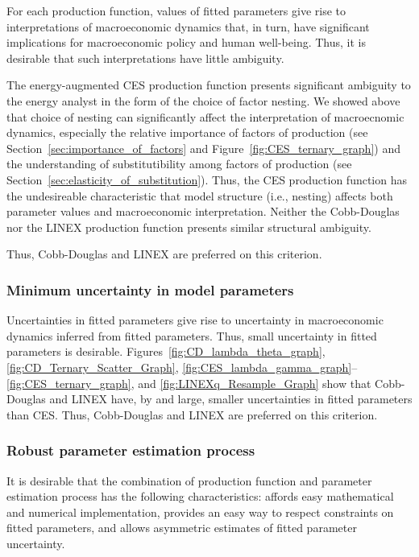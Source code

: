 \documentclass[preprint,authoryear,12pt]{elsarticle}\usepackage[]{graphicx}\usepackage[]{color}
\begin{document}
For each production function, 
values of fitted parameters give rise to interpretations of macroeconomic dynamics
that, in turn, have significant implications for macroeconomic policy
and human well-being.
Thus, it is desirable that such interpretations have little ambiguity.

The energy-augmented CES production function presents 
significant ambiguity to the energy analyst
in the form of the choice of factor nesting.
We showed above that choice of nesting 
can significantly affect 
the interpretation of macroecnomic dynamics, 
especially the relative importance of 
factors of production (see Section~\ref{sec:importance_of_factors}
and Figure~\ref{fig:CES_ternary_graph}) and 
the understanding of substitutibility 
among factors of production (see Section~\ref{sec:elasticity_of_substitution}).
Thus, the CES production function has the undesireable characteristic 
that model structure (i.e., nesting) affects both parameter values 
and macroeconomic interpretation.
Neither the Cobb-Douglas nor the LINEX production function 
presents similar structural ambiguity.

Thus, Cobb-Douglas and LINEX are preferred on this criterion.


\subsubsection{Minimum uncertainty in model parameters} 
\label{sec:min_uncertainty}

Uncertainties in fitted parameters give rise to uncertainty 
in macroeconomic dynamics inferred from fitted parameters.
Thus, small uncertainty in fitted parameters is desirable. 
Figures~\ref{fig:CD_lambda_theta_graph}, \ref{fig:CD_Ternary_Scatter_Graph},
\ref{fig:CES_lambda_gamma_graph}--\ref{fig:CES_ternary_graph}, and
\ref{fig:LINEXq_Resample_Graph} show that 
Cobb-Douglas and LINEX have, by and large, 
smaller uncertainties in fitted parameters than CES.
Thus, Cobb-Douglas and LINEX are preferred on this criterion.


\subsubsection{Robust parameter estimation process} 
\label{sec:robust_estimation}

It is desirable that the combination of production function and parameter estimation process
has the following characteristics:
affords easy mathematical and numerical implementation, 
provides an easy way to respect constraints on fitted parameters, and
allows asymmetric estimates of fitted parameter uncertainty.
\end{document}
